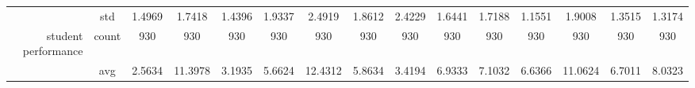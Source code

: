 \begin{table}[htbp]
{\begin{tabular}{rcccc|c|c|c|c|c|ccccc}
			                                                                               & std                                    & 1.4969                                                                             & 1.7418                                                                    & 1.4396                                                                    & 1.9337                                         & 2.4919                                                                    & 1.8612                                       & 2.4229                                      & 1.6441                                         & 1.7188                                         & 1.1551                                          & 1.9008                                          & 1.3515                                         & 1.3174                                         \\
			student performance                                                            & count                                  & 930                                                                                & 930                                                                       & 930                                                                       & 930                                            & 930                                                                       & 930                                          & 930                                         & 930                                            & 930                                            & 930                                             & 930                                             & 930                                            & 930                                            \\
			                                                                               & avg                                    & \cellcolor[rgb]{ .776,  .937,  .808}\textcolor[rgb]{ 0,  .38,  0}{2.5634}          & 11.3978                                                                   & 3.1935                                                                    & 5.6624                                         & 12.4312                                                                   & 5.8634                                       & 3.4194                                      & 6.9333                                         & 7.1032                                         & 6.6366                                          & 11.0624                                         & 6.7011                                         & 8.0323                                         \\

\end{tabular}}
\end{table}
